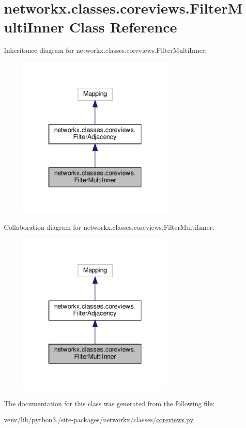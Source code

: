 \hypertarget{classnetworkx_1_1classes_1_1coreviews_1_1FilterMultiInner}{}\section{networkx.\+classes.\+coreviews.\+Filter\+Multi\+Inner Class Reference}
\label{classnetworkx_1_1classes_1_1coreviews_1_1FilterMultiInner}


Inheritance diagram for networkx.\+classes.\+coreviews.\+Filter\+Multi\+Inner\+:
\nopagebreak
\begin{figure}[H]
\begin{center}
\leavevmode
\includegraphics[width=223pt]{classnetworkx_1_1classes_1_1coreviews_1_1FilterMultiInner__inherit__graph}
\end{center}
\end{figure}


Collaboration diagram for networkx.\+classes.\+coreviews.\+Filter\+Multi\+Inner\+:
\nopagebreak
\begin{figure}[H]
\begin{center}
\leavevmode
\includegraphics[width=223pt]{classnetworkx_1_1classes_1_1coreviews_1_1FilterMultiInner__coll__graph}
\end{center}
\end{figure}


The documentation for this class was generated from the following file\+:\begin{DoxyCompactItemize}
\item 
venv/lib/python3./site-\/packages/networkx/classes/\hyperlink{coreviews_8py}{coreviews.\+py}\end{DoxyCompactItemize}
